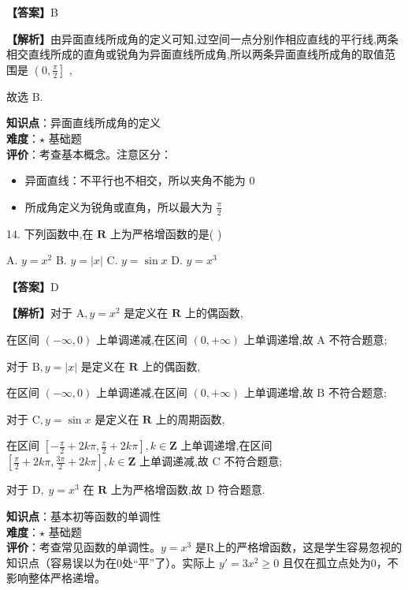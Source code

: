 \documentclass[10pt]{article}
\begin{document}
\textbf{【答案】}B

\textbf{【解析】}由异面直线所成角的定义可知,过空间一点分别作相应直线的平行线,两条相交直线所成的直角或锐角为异面直线所成角,所以两条异面直线所成角的取值范围是 \(\left( {0,\frac{\pi }{2}}\right\rbrack\) ,

故选 B.

\begin{analysisbox}[考点分析]
\textbf{知识点}：异面直线所成角的定义\\
\textbf{难度}：\(\star\) 基础题\\
\textbf{评价}：考查基本概念。注意区分：
\begin{itemize}
\item 异面直线：不平行也不相交，所以夹角不能为 0
\item 所成角定义为锐角或直角，所以最大为 \(\frac{\pi}{2}\)
\end{itemize}
\end{analysisbox}

14. 下列函数中,在 \(\mathbf{R}\) 上为严格增函数的是( )

A. \(y = {x}^{2}\) B. \(y = \left| x\right|\) C. \(y = \sin x\) D. \(y = {x}^{3}\)

\textbf{【答案】}D

\textbf{【解析】}对于 \(\mathrm{A},y = {x}^{2}\) 是定义在 \(\mathbf{R}\) 上的偶函数,

在区间 \(\left( {-\infty ,0}\right)\) 上单调递减,在区间 \(\left( {0, + \infty }\right)\) 上单调递增,故 \(\mathrm{A}\) 不符合题意;

对于 \(\mathrm{B},y = \left| x\right|\) 是定义在 \(\mathbf{R}\) 上的偶函数,

在区间 \(\left( {-\infty ,0}\right)\) 上单调递减,在区间 \(\left( {0, + \infty }\right)\) 上单调递增,故 \(\mathrm{B}\) 不符合题意;

对于 \(\mathrm{C},y = \sin x\) 是定义在 \(\mathbf{R}\) 上的周期函数,

在区间 \(\left\lbrack  {-\frac{\pi }{2} + {2k\pi },\frac{\pi }{2} + {2k\pi }}\right\rbrack  ,k \in  \mathbf{Z}\) 上单调递增,在区间 \(\left\lbrack  {\frac{\pi }{2} + {2k\pi },\frac{3\pi }{2} + {2k\pi }}\right\rbrack  ,k \in  \mathbf{Z}\) 上单调递减,故 \(\mathrm{C}\) 不符合题意;

对于 \(\mathrm{D},\;y = {x}^{3}\) 在 \(\mathbf{R}\) 上为严格增函数,故 \(\mathrm{D}\) 符合题意.

\begin{analysisbox}[考点分析]
\textbf{知识点}：基本初等函数的单调性\\
\textbf{难度}：\(\star\) 基础题\\
\textbf{评价}：考查常见函数的单调性。\(y=x^3\) 是R上的严格增函数，这是学生容易忽视的知识点（容易误以为在0处``平''了）。实际上 \(y' = 3x^2 \geq 0\) 且仅在孤立点处为0，不影响整体严格递增。
\end{analysisbox}
\end{document}
